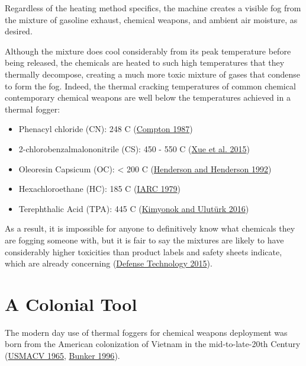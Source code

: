 \documentclass[
  11pt,
]{krantz}
\providecommand{\tightlist}{%
  \setlength{\itemsep}{0pt}\setlength{\parskip}{0pt}}
\begin{document}
Regardless of the heating method specifics, the machine creates a visible fog from the mixture of gasoline exhaust, chemical weapons, and ambient air moisture, as desired.

Although the mixture does cool considerably from its peak temperature before being released, the chemicals are heated to such high temperatures that they thermally decompose, creating a much more toxic mixture of gases that condense to form the fog.
Indeed, the thermal cracking temperatures of common chemical contemporary chemical weapons are well below the temperatures achieved in a thermal fogger:

\begin{itemize}
\tightlist
\item
  Phenacyl chloride (CN): 248 C (\protect\hyperlink{ref-Compton1987}{Compton 1987})
\item
  2-chlorobenzalmalononitrile (CS): 450 - 550 C (\protect\hyperlink{ref-Xueetal2015}{Xue et al. 2015})
\item
  Oleoresin Capsicum (OC): \textless{} 200 C (\protect\hyperlink{ref-HendersonandHenderson1992}{Henderson and Henderson 1992})
\item
  Hexachloroethane (HC): 185 C (\protect\hyperlink{ref-IARC1979}{IARC 1979})
\item
  Terephthalic Acid (TPA): 445 C (\protect\hyperlink{ref-KimyonokandUluturk2016}{Kimyonok and Ulutürk 2016})
\end{itemize}

As a result, it is impossible for anyone to definitively know what chemicals they are fogging someone with, but it is fair to say the mixtures are likely to have considerably higher toxicities than product labels and safety sheets indicate, which are already concerning (\protect\hyperlink{ref-defteccs}{Defense Technology 2015}).

\hypertarget{Vietnam}{%
\chapter{A Colonial Tool}\label{Vietnam}}

The modern day use of thermal foggers for chemical weapons deployment was born from the American colonization of Vietnam in the mid-to-late-20th Century (\protect\hyperlink{ref-USMACV1965}{USMACV 1965}, \protect\hyperlink{ref-Bunker1996}{Bunker 1996}).
\end{document}
